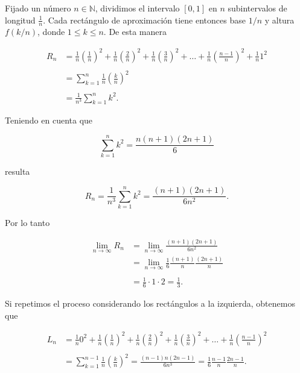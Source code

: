 \documentclass[
  letterpaper,
]{book}
\theoremstyle{plain}
\theoremstyle{remark}
\begin{document}
\begin{tcolorbox}[enhanced jigsaw, opacityback=0, left=2mm, opacitybacktitle=0.6, toprule=.15mm, bottomrule=.15mm, colbacktitle=quarto-callout-tip-color!10!white, titlerule=0mm, bottomtitle=1mm, title=\textcolor{quarto-callout-tip-color}{\faLightbulb}\hspace{0.5em}{Solución}, toptitle=1mm, colframe=quarto-callout-tip-color-frame, colback=white, breakable, rightrule=.15mm, arc=.35mm, leftrule=.75mm, coltitle=black]

Fijado un número \(n\in \mathbb{N}\), dividimos el intervalo \([0,1]\)
en \(n\) subintervalos de longitud \(\frac{1}{n}\). Cada rectángulo de
aproximación tiene entonces base \(1/n\) y altura \(f(k/n)\), donde
\(1\leq k\leq n\). De esta manera

\[
\begin{aligned}
R_n
&= \frac{1}{n}\!\left(\frac{1}{n}\right)^2
   + \frac{1}{n}\!\left(\frac{2}{n}\right)^2
   + \frac{1}{n}\!\left(\frac{3}{n}\right)^2
   + \ldots
   + \frac{1}{n}\!\left(\frac{n-1}{n}\right)^2
   + \frac{1}{n}1^2 \\
   \\
&= \sum_{k=1}^n \frac{1}{n}\!\left(\frac{k}{n}\right)^2\\
\\
&=\frac{1}{n^3}\sum_{k=1}^n k^2.
\end{aligned}
\]

Teniendo en cuenta que

\[
\sum_{k=1}^{n} k^2 = \frac{n(n+1)(2n+1)}{6}
\]

resulta

\[
R_n = \frac{1}{n^3} \sum_{k=1}^{n} k^2 =  \frac{(n+1)(2n+1)}{6n^2}.
\]

Por lo tanto

\[
\begin{aligned}
\lim_{n\rightarrow \infty} R_n &= \lim_{n\rightarrow \infty} \frac{(n+1)(2n+1)}{6n^2}\\
&= \lim_{n\rightarrow \infty} \frac{1}{6}\frac{(n+1)}{n}\frac{(2n+1)}{n}\\
\\
&= \frac{1}{6}\cdot 1 \cdot 2 = \frac{1}{3}.
\end{aligned}
\]

Si repetimos el proceso considerando los rectángulos a la izquierda,
obtenemos que

\[
\begin{aligned}
L_n &= \frac{1}{n} 0^2 + \frac{1}{n}\left(\frac{1}{n}\right)^2 + \frac{1}{n}\left(\frac{2}{n}\right)^2 + \frac{1}{n}\left(\frac{3}{n}\right)^2 + \ldots + \frac{1}{n}\left(\frac{n-1}{n}\right)^2 \\
\\
&= \sum_{k=1}^{n-1} \frac{1}{n}\!\left(\frac{k}{n}\right)^2=\frac{(n-1)n(2n-1)}{6n^3}=\frac{1}{6}\frac{n-1}{n}\frac{2n-1}{n}.
\end{aligned}
\]


\end{tcolorbox}
\end{document}
